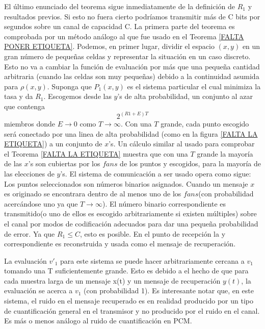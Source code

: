 El \'ultimo enunciado del teorema sigue inmediatamente de la
definici\'on de $R_{1}$ y resultados previos. Si esto no fuera cierto
podr\'iamos transmitir m\'as de C bits por segundos sobre un canal de
capacidad C. La primera parte del teorema es comprobada por un
m\'etodo an\'alogo al que fue usado en el Teorema \ref{FALTA PONER
 ETIQUETA}. Podemos, en primer lugar, dividir el espacio $(x,y)$ en
un gran n\'umero de peque\~{n}as celdas y representar la situaci\'on
en un caso discreto. Esto no va a cambiar la funci\'on de evaluaci\'on
por m\'as que una peque\~{n}a cantidad arbitraria (cuando las celdas
son muy peque\~{n}as) debido a la continuidad asumida para
$\rho(x,y)$. Suponga que $P_1(x,y)$ es el sistema particular el cual
minimiza la tasa y da $R_{1}$. Escogemos desde las $y$'s de alta
probabilidad, un conjunto al azar que contenga
\begin{equation} 2^{(R1 + E)T} \end{equation}
miembros donde $E \rightarrow 0$ como $T \rightarrow \infty$. Con una
$T$ grande, cada punto escogido ser\'a conectado por una linea de alta
probabilidad (como en la figura \ref{FALTA LA ETIQUETA}) a un conjunto
de $x$'s. Un c\'alculo similar al usado para comprobar el Teorema
\ref{FALTA LA ETIQUETA} muestra que con una $T$ grande la mayor\'ia de
las $x$'s son cubiertas por los $fans$ de los puntos y escogidos, para
la mayor\'ia de las elecciones de $y$'s. El sistema de comunicaci\'on
a ser usado opera como sigue: Los puntos seleccionados son n\'umeros
binarios asignados. Cuando un mensaje $x$ es originado se encontrara
dentro de al menos uno de los $fans$(con probabilidad acerc\'andose
uno ya que $T \rightarrow \infty$). El n\'umero binario
correspondiente es transmitido(o uno de ellos es escogido
arbitrariamente si existen m\'ultiples) sobre el canal por modos de
codificaci\'on adecuados para dar una pequeña probabilidad de
error. Ya que $R_{1} \leq C$, esto es posible. En el punto de
recepci\'on la y correspondiente es reconstruida y usada como el
mensaje de recuperaci\'on.

La evaluaci\'on $v'_{1}$ para este sistema se puede hacer
arbitrariamente cercana a $v_{1}$ tomando una T suficientemente
grande. Esto es debido a el hecho de que para cada muestra larga de un
mensaje x(t) y un mensaje de recuperaci\'on $y(t)$, la evaluaci\'on se
acerca a $v_{1}$ (con probabilidad 1). Es interesante notar que, en
este sistema, el ruido en el mensaje recuperado es en realidad
producido por un tipo de cuantificaci\'on general en el transmisor y
no producido por el ruido en el canal. Es m\'as o menos an\'alogo al
ruido de cuantificaci\'on en PCM.

